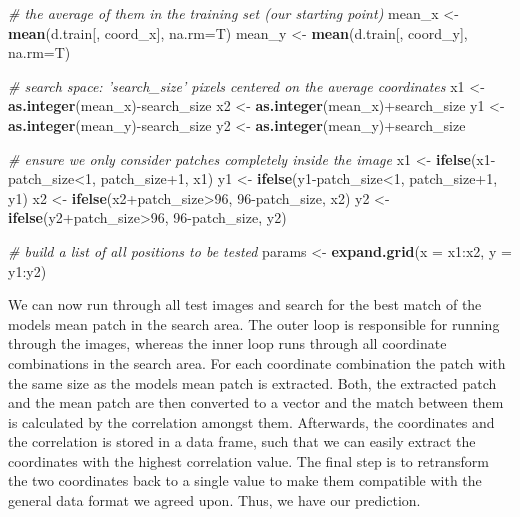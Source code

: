 \documentclass[]{article}
\newenvironment{Shaded}{\begin{snugshade}}{\end{snugshade}}
\newcommand{\KeywordTok}[1]{\textcolor[rgb]{0.13,0.29,0.53}{\textbf{{#1}}}}
\newcommand{\DataTypeTok}[1]{\textcolor[rgb]{0.13,0.29,0.53}{{#1}}}
\newcommand{\DecValTok}[1]{\textcolor[rgb]{0.00,0.00,0.81}{{#1}}}
\newcommand{\StringTok}[1]{\textcolor[rgb]{0.31,0.60,0.02}{{#1}}}
\newcommand{\CommentTok}[1]{\textcolor[rgb]{0.56,0.35,0.01}{\textit{{#1}}}}
\newcommand{\NormalTok}[1]{{#1}}
\begin{document}
\begin{Shaded}
\begin{Highlighting}[]
  \CommentTok{# the average of them in the training set (our starting point)}
  \NormalTok{mean_x  <-}\StringTok{ }\KeywordTok{mean}\NormalTok{(d.train[, coord_x], }\DataTypeTok{na.rm=}\NormalTok{T)}
  \NormalTok{mean_y  <-}\StringTok{ }\KeywordTok{mean}\NormalTok{(d.train[, coord_y], }\DataTypeTok{na.rm=}\NormalTok{T)}

  \CommentTok{# search space: 'search_size' pixels centered on the average coordinates}
  \NormalTok{x1 <-}\StringTok{ }\KeywordTok{as.integer}\NormalTok{(mean_x)-search_size}
  \NormalTok{x2 <-}\StringTok{ }\KeywordTok{as.integer}\NormalTok{(mean_x)+search_size}
  \NormalTok{y1 <-}\StringTok{ }\KeywordTok{as.integer}\NormalTok{(mean_y)-search_size}
  \NormalTok{y2 <-}\StringTok{ }\KeywordTok{as.integer}\NormalTok{(mean_y)+search_size}

  \CommentTok{# ensure we only consider patches completely inside the image}
  \NormalTok{x1 <-}\StringTok{ }\KeywordTok{ifelse}\NormalTok{(x1-patch_size<}\DecValTok{1}\NormalTok{,  patch_size}\DecValTok{+1}\NormalTok{,  x1)}
  \NormalTok{y1 <-}\StringTok{ }\KeywordTok{ifelse}\NormalTok{(y1-patch_size<}\DecValTok{1}\NormalTok{,  patch_size}\DecValTok{+1}\NormalTok{,  y1)}
  \NormalTok{x2 <-}\StringTok{ }\KeywordTok{ifelse}\NormalTok{(x2+patch_size>}\DecValTok{96}\NormalTok{, }\DecValTok{96}\NormalTok{-patch_size, x2)}
  \NormalTok{y2 <-}\StringTok{ }\KeywordTok{ifelse}\NormalTok{(y2+patch_size>}\DecValTok{96}\NormalTok{, }\DecValTok{96}\NormalTok{-patch_size, y2)}

  \CommentTok{# build a list of all positions to be tested}
  \NormalTok{params <-}\StringTok{ }\KeywordTok{expand.grid}\NormalTok{(}\DataTypeTok{x =} \NormalTok{x1:x2, }\DataTypeTok{y =} \NormalTok{y1:y2)}
\end{Highlighting}
\end{Shaded}

We can now run through all test images and search for the best match of
the models mean patch in the search area. The outer loop is responsible
for running through the images, whereas the inner loop runs through all
coordinate combinations in the search area. For each coordinate
combination the patch with the same size as the models mean patch is
extracted. Both, the extracted patch and the mean patch are then
converted to a vector and the match between them is calculated by the
correlation amongst them. Afterwards, the coordinates and the
correlation is stored in a data frame, such that we can easily extract
the coordinates with the highest correlation value. The final step is to
retransform the two coordinates back to a single value to make them
compatible with the general data format we agreed upon. Thus, we have
our prediction.
\end{document}
